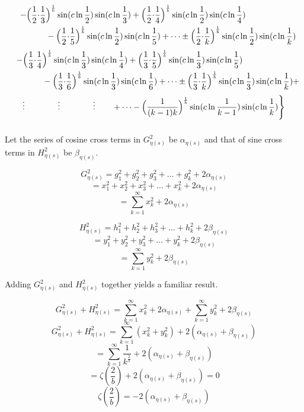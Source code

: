 \documentclass{amsart}
\begin{document}
	\[
	\begin{aligned}
		\quad - \Bigl( \frac{1}{2} {\cdot} \frac{1}{3}& \Bigr)^\frac1b \sin(c \ln \frac{1}{2}) \sin(c \ln \frac{1}{3}) + \Bigl( \frac{1}{2} {\cdot} \frac{1}{4} \Bigr)^\frac1b \sin(c \ln \frac{1}{2}) \sin(c \ln \frac{1}{4}) \\ 
		& - \Bigl( \frac{1}{2} {\cdot} \frac{1}{5} \Bigr)^\frac1b \sin(c \ln \frac{1}{2}) \sin(c \ln \frac{1}{5}) + \dots \pm \Bigl( \frac{1}{2} {\cdot} \frac{1}{k} \Bigr)^\frac1b \sin(c \ln \frac{1}{2}) \sin(c \ln \frac{1}{k}) \\
	\end{aligned}
	\]
	\[
	\begin{aligned}
		\quad - \Bigl( \frac{1}{3} {\cdot} \frac{1}{4}& \Bigr)^\frac1b \sin(c \ln \frac{1}{3}) \sin(c \ln \frac{1}{4}) + \Bigl( \frac{1}{3} {\cdot} \frac{1}{5} \Bigr)^\frac1b \sin(c \ln \frac{1}{3}) \sin(c \ln \frac{1}{5}) \\
		& - \Bigl( \frac{1}{3} {\cdot} \frac{1}{6} \Bigr)^\frac1b \sin(c \ln \frac{1}{3}) \sin(c \ln \frac{1}{6}) + \dots \pm \Bigl( \frac{1}{3} {\cdot} \frac{1}{k} \Bigr)^\frac1b \sin(c \ln \frac{1}{3}) \sin(c \ln \frac{1}{k}) + \\ 		
	\end{aligned}
	\]
	\[
	\begin{aligned}
		\vdots \qquad\qquad \vdots \qquad\qquad \vdots \qquad + \dots - \Bigl( \frac{1}{(k-1)k} \Bigr)^\frac1b \sin(c \ln \frac{1}{k-1}) \sin(c \ln \frac{1}{k}) \Biggr\}
	\end{aligned}
	\]
	\[\]
	
	Let the series of cosine cross terms in $G_{\eta(s)}^2$ be $\alpha_{\eta(s)}$ and that of sine cross terms in $H_{\eta(s)}^2$ be $\beta_{\eta(s)}$.
	
	\[ G_{\eta(s)}^2 = g_1^2 + g_2^2 + g_3^2 + \dots + g_k^2 + 2\alpha_{\eta(s)} \]
	\[ = x_1^2 + x_2^2 + x_3^2 + \dots + x_k^2 + 2\alpha_{\eta(s)} \]
	\[ = \sum\limits_{k=1}^{\infty}x_k^2 + 2\alpha_{\eta(s)} \]
	
	\[ H_{\eta(s)}^2 = h_1^2 + h_2^2 + h_3^2 + \dots + h_k^2 + 2\beta_{\eta(s)} \]
	\[ = y_1^2 + y_2^2 + y_3^2 + \dots + y_k^2 + 2\beta_{\eta(s)} \]
	\[ = \sum\limits_{k=1}^{\infty}y_k^2 + 2\beta_{\eta(s)} \]
	
	Adding $G_{\eta(s)}^2$ and $H_{\eta(s)}^2$ together yields a familiar result.
	
	\[ G_{\eta(s)}^2 + H_{\eta(s)}^2 = \sum\limits_{k=1}^{\infty}x_k^2 + 2\alpha_{\eta(s)} + \sum\limits_{k=1}^{\infty}y_k^2 + 2\beta_{\eta(s)} \]
	\[ G_{\eta(s)}^2 + H_{\eta(s)}^2 = \sum\limits_{k=1}^{\infty}(x_k^2 + y_k^2) + 2(\alpha_{\eta(s)} + \beta_{\eta(s)}) \]
	\[ = \sum\limits_{k=1}^{\infty}\frac{1}{k^{\frac{2}{b}}} + 2(\alpha_{\eta(s)} + \beta_{\eta(s)}) \]
	\[ = \zeta(\frac{2}{b}) + 2(\alpha_{\eta(s)} + \beta_{\eta(s)}) = 0 \]
	\[ \zeta(\frac{2}{b}) = - 2(\alpha_{\eta(s)} + \beta_{\eta(s)}) \]
	
\end{document}
